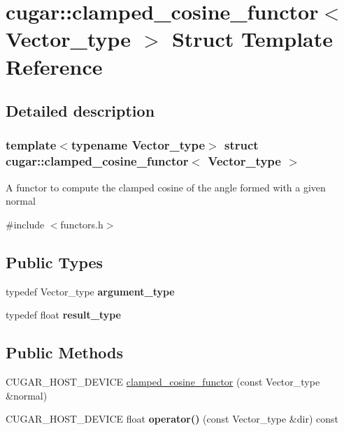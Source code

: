\hypertarget{structcugar_1_1clamped__cosine__functor}{}\section{cugar\+:\+:clamped\+\_\+cosine\+\_\+functor$<$ Vector\+\_\+type $>$ Struct Template Reference}
\label{structcugar_1_1clamped__cosine__functor}


\subsection{Detailed description}
\subsubsection*{template$<$typename Vector\+\_\+type$>$\newline
struct cugar\+::clamped\+\_\+cosine\+\_\+functor$<$ Vector\+\_\+type $>$}

A functor to compute the clamped cosine of the angle formed with a given normal 

{\ttfamily \#include $<$functors.\+h$>$}

\subsection*{Public Types}
\begin{DoxyCompactItemize}
\item 
\mbox{\label{structcugar_1_1clamped__cosine__functor_a9bc0225f4c67f1693319262e4388bcd4}} 
typedef Vector\+\_\+type {\bfseries argument\+\_\+type}
\item 
\mbox{\label{structcugar_1_1clamped__cosine__functor_a885a9a3f74842abb6cb43a8203c04773}} 
typedef float {\bfseries result\+\_\+type}
\end{DoxyCompactItemize}
\subsection*{Public Methods}
\begin{DoxyCompactItemize}
\item 
C\+U\+G\+A\+R\+\_\+\+H\+O\+S\+T\+\_\+\+D\+E\+V\+I\+CE \hyperlink{structcugar_1_1clamped__cosine__functor_a24f2ce1992a26dc465f5167742b76207}{clamped\+\_\+cosine\+\_\+functor} (const Vector\+\_\+type \&normal)
\item 
\mbox{\label{structcugar_1_1clamped__cosine__functor_a2e6a96b9d79c216b7eae16133efd3738}} 
C\+U\+G\+A\+R\+\_\+\+H\+O\+S\+T\+\_\+\+D\+E\+V\+I\+CE float {\bfseries operator()} (const Vector\+\_\+type \&dir) const
\end{DoxyCompactItemize}
